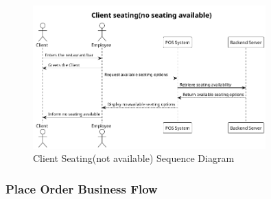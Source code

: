 \documentclass[]{VUMIFTemplateClass}
\begin{document}
\begin{figure}[H]
    \centering
    \includegraphics[width=0.8\textwidth]{images/diagrams/orders/order_client_seating_not_available_sequence.png}
    \caption{Client Seating(not available) Sequence Diagram}
    \label{fig:client_seating_not_available_sequence}
\end{figure}

\subsubsection{Place Order Business Flow}
\end{document}
